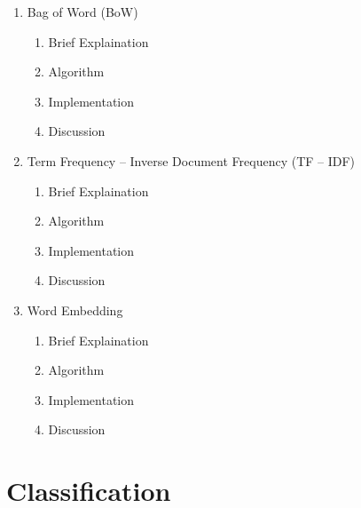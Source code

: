 \documentclass{article}
\begin{document}
\begin{enumerate}[label=3.\arabic*]
    \item Bag of Word (BoW) \\
    \begin{enumerate}[label=3.1.\arabic*]
        \item Brief Explaination
        \item Algorithm
        \item Implementation
        \item Discussion
    \end{enumerate}
    
    \item Term Frequency – Inverse Document Frequency (TF – IDF)
    \begin{enumerate}[label=3.2.\arabic*]
        \item Brief Explaination
        \item Algorithm
        \item Implementation
        \item Discussion
    \end{enumerate}
    
    \item Word Embedding
    \begin{enumerate}[label=3.3.\arabic*]
        \item Brief Explaination
        \item Algorithm
        \item Implementation
        \item Discussion
    \end{enumerate}
\end{enumerate}


\section{Classification}
\end{document}
